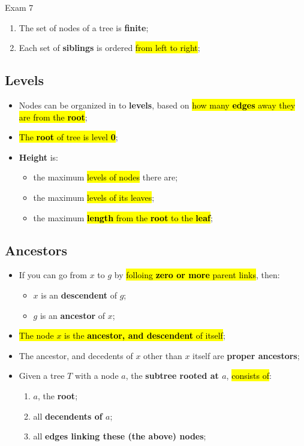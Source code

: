 \documentclass{note}
\begin{document}
\begin{note}{Exam 7}
    \begin{enumerate}
        \item The set of nodes of a tree is \textbf{finite};
        \item Each set of \textbf{siblings} is ordered \hl{from left to right};
    \end{enumerate}

    \subsection{Levels}

    \begin{itemize}
        \item Nodes can be organized in to \textbf{levels}, based on \hl{how many \textbf{edges} away they are from the \textbf{root}};
        \item \hl{The \textbf{root} of tree is level \textbf{0}};
        \item \textbf{Height} is:
        \begin{itemize}
            \item the maximum \hl{levels of nodes} there are;
            \item the maximum \hl{levels of its leaves};
            \item the maximum \hl{\textbf{length} from the \textbf{root} to the \textbf{leaf}};
        \end{itemize}
    \end{itemize}

    \subsection{Ancestors}

    \begin{itemize}
        \item If you can go from $ x $ to $ g $ by \hl{folloing \textbf{zero or more} parent links}, then:
        \begin{itemize}
            \item $ x $ is an \textbf{descendent} of $ g $;
            \item $ g $ is an \textbf{ancestor} of $ x $;
        \end{itemize}

        \item \hl{The node $ x $ is the \textbf{ancestor, and descendent} of itself};
        \item The ancestor, and decedents of $ x $ other than $ x $ itself are \textbf{proper ancestors};
        \item Given a tree $ T $ with a node $ a $, the \textbf{subtree rooted at $ a $}, \hl{consists of}:
        \begin{enumerate}
            \item $ a $, the \textbf{root};
            \item all \textbf{decendents of $ a $};
            \item all \textbf{edges linking these (the above) nodes};
        \end{enumerate}
    \end{itemize}


\end{note}
\end{document}
